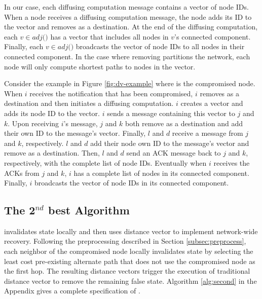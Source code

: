 In our case, each diffusing computation message contains a vector of node IDs.  When 
a node receives a diffusing computation message, the node adds its ID to the vector and removes \bad as a destination. At the end of the diffusing computation, 
each $v \in adj($\bads$)$ has a vector that includes all nodes in $v$'s connected component. Finally, each $v \in adj($\bads$)$ broadcasts the vector of node IDs to 
all nodes in their connected component. In the case where removing \bad partitions the network, each node will only compute shortest paths to nodes in the vector. 

Consider the example in Figure \ref{fig:dv-example} where \bad is the compromised node. 
When $i$ receives the notification that \bad has been compromised, $i$ removes \bad as a destination and then initiates a diffusing computation. 
$i$ creates a vector and adds its node ID to the vector. $i$ sends a message containing this vector to $j$ and $k$.  Upon receiving $i$'s message,
$j$ and $k$ both remove \bad as a destination and add their own ID to the message's vector.  Finally, $l$ and $d$ receive a message from $j$ and $k$, respectively.  
$l$ and $d$ add their node own ID to the message's vector and remove \bad as a destination. Then, $l$ and $d$ send an ACK message back to $j$ and $k$, respectively, with the complete 
list of node IDs. Eventually when $i$ receives the ACKs from $j$ and $k$, $i$ has a complete list of nodes in its connected component. Finally, $i$ broadcasts the vector of node IDs
in its connected component. 


\subsection{The 2$^{nd}$ best Algorithm}
\label{subsec:second}
\second invalidates state locally and then uses distance vector to implement network-wide recovery.  Following the preprocessing described in Section \ref{subsec:preprocess}, 
each neighbor of the compromised node locally invalidates state by selecting the least cost pre-existing alternate path that does not use the compromised node as the first hop.
The resulting distance vectors trigger the execution of traditional distance vector to remove the remaining false state.
Algorithm \ref{alg:second} in the Appendix gives a complete specification of \seconds.

